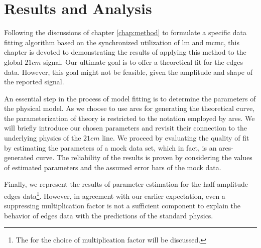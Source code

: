 \documentclass[12pt, TexShade, letterpaper]{report}
\begin{document}
\chapter{Results and Analysis}
\label{chap:results}
Following the discussions of chapter \ref{chap:method} to formulate a specific data fitting algorithm based on the synchronized utilization of \gls{lm} and \gls{mcmc}, this chapter is devoted to demonstrating the results of applying this method to the global $21cm$ signal. Our ultimate goal is to offer a theoretical fit for the \gls{edges} data. However, this goal might not be feasible, given the amplitude and shape of the reported signal.\par
An essential step in the process of model fitting is to determine the parameters of the physical model. As we choose to use \gls{ares} for generating the theoretical curve, the parameterization of theory is restricted to the notation employed by \gls{ares}. We will briefly introduce our chosen parameters and revisit their connection to the underlying physics of the $21cm$ line. We proceed by evaluating the quality of fit by estimating the parameters of a mock data set, which in fact, is an \gls{ares}-generated curve. The reliability of the results is proven by considering the values of estimated parameters and the assumed error bars of the mock data. \par
Finally, we represent the results of parameter estimation for the half-amplitude \gls{edges} data\footnote{The for the choice of multiplication factor will be discussed.}. However, in agreement with our earlier expectation, even a suppressing multiplication factor is not a sufficient component to explain the behavior of \gls{edges} data with the predictions of the standard physics. \par
\end{document}
